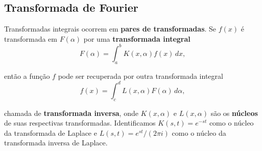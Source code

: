 \documentclass{article}
\begin{document}
\subsection{Transformada de Fourier}

\begin{rem}
    Transformadas integrais ocorrem em \textbf{pares de transformadas}. Se \(f(x)\) é transformada em \(F(\alpha)\) por uma \textbf{transformada integral}
    \begin{equation}
        F(\alpha) = \int_{a}^{b} K(x,\alpha) f(x) \, dx,
    \end{equation}
\end{rem}

\noindent então a função \(f\) pode ser recuperada por outra transformada integral 
\begin{equation}
    f(x) = \int_{c}^{d} L(x,\alpha) F(\alpha) \, d\alpha,
\end{equation}

\noindent chamada de \textbf{transformada inversa}, onde \(K(x,\alpha)\) e \(L(x,\alpha)\) são os \textbf{núcleos} de suas respectivas transformadas. Identificamos \(K(s,t)=e^{-st}\) como o núcleo da transformada de Laplace e \(L(s,t) = e^{st}/(2\pi i)\) como o núcleo da transformada inversa de Laplace.
\end{document}
